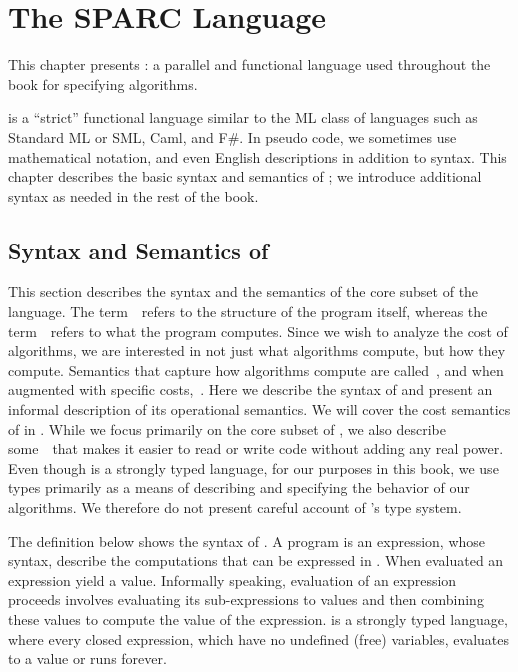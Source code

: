 \chapter{The SPARC Language}
\label{chapter:sparc}

\begin{preamble}
This chapter presents \pml{}: a parallel and functional language used
throughout the book for specifying algorithms.

%
\pml is a ``strict'' functional language similar to the ML class of
languages such as Standard ML or SML, Caml, and F\#.
%
In pseudo code, we sometimes use mathematical notation, and even
English descriptions in addition to \pml{} syntax.
%
This chapter describes the basic syntax and semantics of \pml{}; we
introduce additional syntax as needed in the rest of the book.
\end{preamble}

\section{Syntax and Semantics of \pml{}}

\begin{gram}
This section describes the syntax and the semantics of the core subset
of the \pml{} language.  The term~~refers to the
structure of the program itself, whereas the
term~~refers to what the program computes.
%
Since we wish to analyze the cost of algorithms, we are interested in
not just what algorithms compute, but how they compute.
%
Semantics that capture how algorithms compute are
called~, and when augmented with specific
costs,~.
%
Here we describe the syntax of \pml{} and present an informal
description of its operational semantics. 
%
We will cover the cost semantics of \pml in .
%
While we focus primarily on the core subset of \pml, we also describe
some~~that makes it easier to read or write code
without adding any real power.
%
Even though \pml is a strongly typed language, for our purposes in
this book, we use types primarily as a means of describing and
specifying the behavior of our algorithms.
%
We therefore do not present careful account of \pml's type system.
\end{gram}


\begin{gram}
The definition below shows the syntax of \pml{}.
%
A \pml{} program is an expression, whose syntax,
 describe the computations that can be expressed in \pml{}.
%
When evaluated an expression yield a value.
%
Informally speaking, evaluation of an expression proceeds involves
evaluating its sub-expressions to values and then combining these
values  to compute the value of the expression.
%
\pml{} is a strongly typed language, where every closed expression,
which have no undefined (free) variables, evaluates to a value or runs
forever.
%
\end{gram}

